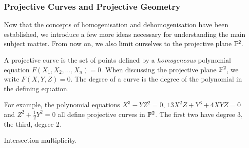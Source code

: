 \subsubsection{Projective Curves and Projective Geometry}
Now that the concepts of homogenisation and dehomogenisation have been established, we introduce a few more ideas necessary for understanding the main subject matter.
From now on, we also limit ourselves to the projective plane $\pn[2]$.

\begin{definition}
	A projective curve is the set of points defined by a \emph{homogeneous} polynomial equation $F(X_1,X_2,\ldots,X_n) = 0$.
	When discussing the projective plane $\pn[2]$, we write $F(X,Y,Z) = 0$.
	The degree of a curve is the degree of the polynomial in the defining equation.
\end{definition}
For example, the polynomial equations $X^3-YZ^2=0$, $13X^2Z + Y^3 + 4XYZ = 0$ and $Z^2 + \frac{1}{2}Y^2 = 0$ all define projective curves in $\pn[2]$.
The first two have degree 3, the third, degree 2.

\begin{definition}
	Intersection multiplicity.
\end{definition}

